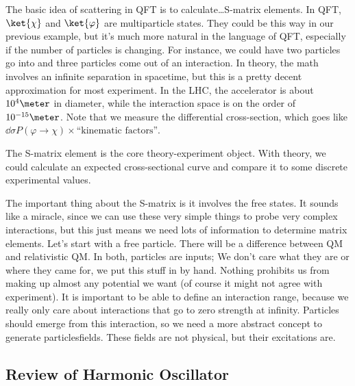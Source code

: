 \documentclass[a4paper,twoside,master.tex]{subfiles}
\begin{document}
The basic idea of scattering in QFT is to calculate\ldots S-matrix elements. In QFT, $\ket{\chi} $ and $\ket{\varphi} $ are multiparticle states. They could be this way in our previous example, but it's much more natural in the language of QFT, especially if the number of particles is changing. For instance, we could have two particles go into and three particles come out of an interaction. In theory, the math involves an infinite separation in spacetime, but this is a pretty decent approximation for most experiment. In the LHC, the accelerator is about $ 10^4\meter $ in diameter, while the interaction space is on the order of $ 10^{-15}\meter $. Note that we measure the differential cross-section, which goes like $ \dd{\sigma} P(\varphi \to \chi) \times \text{``kinematic factors''} $.

The S-matrix element is the core theory-experiment object. With theory, we could calculate an expected cross-sectional curve and compare it to some discrete experimental values.

The important thing about the S-matrix is it involves the free states. It sounds like a miracle, since we can use these very simple things to probe very complex interactions, but this just means we need lots of information to determine matrix elements. Let's start with a free particle. There will be a difference between QM and relativistic QM. In both, particles are inputs; We don't care what they are or where they came for, we put this stuff in by hand. Nothing prohibits us from making up almost any potential we want (of course it might not agree with experiment). It is important to be able to define an interaction range, because we really only care about interactions that go to zero strength at infinity. Particles should emerge from this interaction, so we need a more abstract concept to generate particles\textemdash fields. These fields are not physical, but their excitations are.

\subsection{Review of Harmonic Oscillator}
\label{sub:review_of_harmonic_oscillator}
\end{document}
